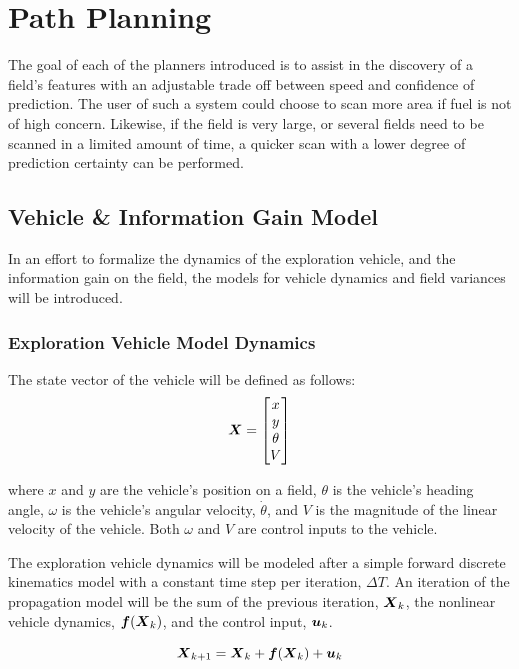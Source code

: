 \chapter{Path Planning} \label{ch:pp}
The goal of each of the planners introduced is to assist in the discovery of a field's features with an adjustable trade off between speed and confidence of prediction. The user of such a system could choose to scan more area if fuel is not of high concern. Likewise, if the field is very large, or several fields need to be scanned in a limited amount of time, a quicker scan with a lower degree of prediction certainty can be performed.

\section{Vehicle \& Information Gain Model}
In an effort to formalize the dynamics of the exploration vehicle, and the information gain on the field, the models for vehicle dynamics and field variances will be introduced.

\subsection{Exploration Vehicle Model Dynamics} \label{sec:vehicledynamics}
The state vector of the vehicle will be defined as follows:
\begin{equation}
{\it{\boldsymbol{X}}} = \begin{bmatrix}
	x \\
	y \\
	\theta \\
	V
\end{bmatrix}
\label{eq:vehiclemodel}
\end{equation}

\noindent where $x$ and $y$ are the vehicle's position on a field, $\theta$ is the vehicle's heading angle, $\omega$ is the vehicle's angular velocity, $\dot{\theta}$, and $V$ is the magnitude of the linear velocity of the vehicle. Both $\omega$ and $V$ are control inputs to the vehicle.

The exploration vehicle dynamics will be modeled after a simple forward discrete kinematics model with a constant time step per iteration, $\Delta T$. An iteration of the propagation model will be the sum of the previous iteration, ${\it{\boldsymbol{X}}}_{k}$, the nonlinear vehicle dynamics, ${\it{\boldsymbol{f}}}({\it{\boldsymbol{X}}}_k)$, and the control input, ${\it{\boldsymbol{u}}}_k$.

\begin{equation}
	{\it{\boldsymbol{X}}}_{k+1} = {\it{\boldsymbol{X}}}_k + {\it{\boldsymbol{f}}}({\it{\boldsymbol{X}}}_{k}) + {\it{\boldsymbol{u}}}_k
	\label{eq:vehicledynamicsform}
\end{equation}

